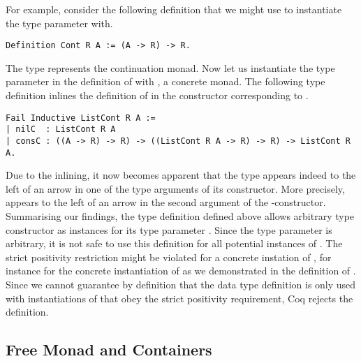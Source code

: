 For example, consider the following definition that we might use to instantiate the type parameter with.

\begin{verbatim}
Definition Cont R A := (A -> R) -> R.
\end{verbatim}

The type  represents the continuation monad.
Now let us instantiate the type parameter  in the definition of  with , a concrete monad.
The following type definition  inlines the definition of  in the constructor corresponding to .

\begin{verbatim}
Fail Inductive ListCont R A :=
| nilC  : ListCont R A
| consC : ((A -> R) -> R) -> ((ListCont R A -> R) -> R) -> ListCont R A.
\end{verbatim}

Due to the inlining, it now becomes apparent that the type  appears indeed to the left of an arrow in one of the type arguments of its constructor.
More precisely,  appears to the left of an arrow in the second argument of the -constructor.
Summarising our findings, the type definition  defined above allows arbitrary type constructor as instances for its type parameter .
Since the type parameter is arbitrary, it is not safe to use this definition for all potential instances of .
The strict positivity restriction might be violated for a concrete instation of , for instance for the concrete instantiation of  as we demonstrated in the definition of .
Since we cannot guarantee by definition that the data type definition  is only used with instantiations of  that obey the strict positivity requirement, Coq rejects the definition.

\subsection{Free Monad and Containers}
\label{subsec:freeAndContainers}

